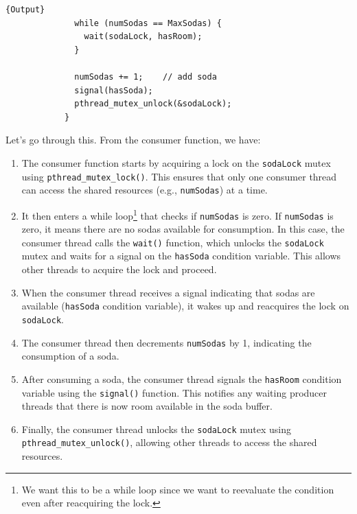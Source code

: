 \documentclass{article}
\begin{document}
\begin{example}
\begin{enumerate}
\begin{minipage}{.49\linewidth}
\begin{lstlisting}[]{Output}
              while (numSodas == MaxSodas) {
                wait(sodaLock, hasRoom); 
              }

              numSodas += 1;    // add soda 
              signal(hasSoda);  
              pthread_mutex_unlock(&sodaLock); 
            }
          \end{lstlisting}
          \end{minipage}
      \end{enumerate}
      Let's go through this. From the consumer function, we have: 
      
      \begin{enumerate}
        \item The consumer function starts by acquiring a lock on the \texttt{sodaLock} mutex using \texttt{pthread\_mutex\_lock()}. This ensures that only one consumer thread can access the shared resources (e.g., \texttt{numSodas}) at a time.

        \item It then enters a while loop\footnote{We want this to be a while loop since we want to reevaluate the condition even after reacquiring the lock. } that checks if \texttt{numSodas} is zero. If \texttt{numSodas} is zero, it means there are no sodas available for consumption. In this case, the consumer thread calls the \texttt{wait()} function, which unlocks the \texttt{sodaLock} mutex and waits for a signal on the \texttt{hasSoda} condition variable. This allows other threads to acquire the lock and proceed.

        \item When the consumer thread receives a signal indicating that sodas are available (\texttt{hasSoda} condition variable), it wakes up and reacquires the lock on \texttt{sodaLock}.

        \item The consumer thread then decrements \texttt{numSodas} by 1, indicating the consumption of a soda.

        \item After consuming a soda, the consumer thread signals the \texttt{hasRoom} condition variable using the \texttt{signal()} function. This notifies any waiting producer threads that there is now room available in the soda buffer.

        \item Finally, the consumer thread unlocks the \texttt{sodaLock} mutex using \texttt{pthread\_mutex\_unlock()}, allowing other threads to access the shared resources.
      \end{enumerate}
      

\end{example}
\end{document}
